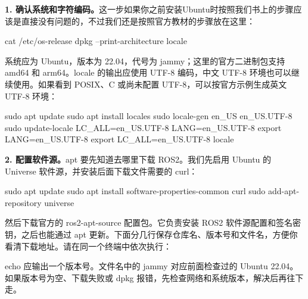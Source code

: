 \textbf{1. 确认系统和字符编码。}这一步如果你之前安装Ubuntu时按照我们书上的步骤应该是直接没有问题的，不过我们还是按照官方教材的步骤放在这里：
\par\medskip\noindent\begin{minipage}{\linewidth}
\begin{tbash}
cat /etc/os-release
dpkg --print-architecture
locale
\end{tbash}
\end{minipage}\par\smallskip
系统应为 Ubuntu，版本为 22.04，代号为 jammy；这里的官方二进制包支持 amd64 和 arm64。locale 的输出应使用 UTF-8 编码，中文 UTF-8 环境也可以继续使用。如果看到 POSIX、C 或尚未配置 UTF-8，可以按官方示例生成英文 UTF-8 环境：
\par\medskip\noindent\begin{minipage}{\linewidth}
\begin{tbash}
sudo apt update
sudo apt install locales
sudo locale-gen en_US en_US.UTF-8
sudo update-locale LC_ALL=en_US.UTF-8 LANG=en_US.UTF-8
export LANG=en_US.UTF-8
export LC_ALL=en_US.UTF-8
locale
\end{tbash}
\end{minipage}\par\smallskip

\textbf{2. 配置软件源。}apt 要先知道去哪里下载 ROS2。我们先启用 Ubuntu 的 Universe 软件源，并安装后面下载文件需要的 curl：
\par\medskip\noindent\begin{minipage}{\linewidth}
\begin{tbash}
sudo apt update
sudo apt install software-properties-common curl
sudo add-apt-repository universe
\end{tbash}
\end{minipage}\par\smallskip
然后下载官方的 ros2-apt-source 配置包。它负责安装 ROS2 软件源配置和签名密钥，之后也能通过 apt 更新。下面分几行保存仓库名、版本号和文件名，方便你看清下载地址。请在同一个终端中依次执行：
\par\medskip\noindent\begin{minipage}{\linewidth}
\end{minipage}\par\smallskip
echo 应输出一个版本号。文件名中的 jammy 对应前面检查过的 Ubuntu 22.04。如果版本号为空、下载失败或 dpkg 报错，先检查网络和系统版本，解决后再往下走。

